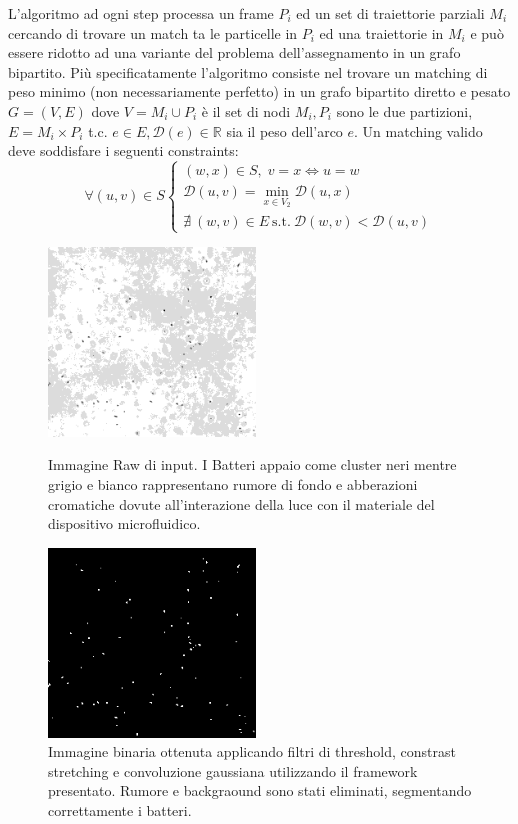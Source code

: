 \documentclass[a4paper,11pt]{paper}
\begin{document}
L'algoritmo ad ogni step processa un frame $P_i$ ed un set di traiettorie parziali $M_i$ cercando di trovare un match ta le particelle in $P_i$ ed una traiettorie in $M_i$ e può essere ridotto ad una variante del problema dell'assegnamento in un grafo bipartito.
Più specificatamente l'algoritmo consiste nel trovare un matching di peso minimo (non necessariamente perfetto) in un grafo bipartito diretto e pesato $G=(V,E)$ dove $V={M_i} \cup P_i$ è il set di nodi ${M_i}, P_i$ sono le due partizioni, $E = {M_i} \times P_i$ t.c. $e \in E, \mathcal{D}(e) \in \mathbb{R}$ sia il peso dell'arco $e$.
Un matching valido deve soddisfare i seguenti constraints: 
\begin{equation}
\forall (u,v) \in S 
\left\{
  \begin{array}{lr}
   (w,x) \in S,\; v=x\Longleftrightarrow u=w\\
   \mathcal{D}(u,v) = \min_{x \in V_2} \mathcal{D}(u,x)  \\
    \nexists \: (w,v) \in E \: \mbox{s.t.} \: \mathcal{D}(w,v) < \mathcal{D}(u,v)
  \end{array}
\right.
\label{matchConstraints}
\end{equation}
\begin{figure}
    \begin{minipage}[l]{0.5\textwidth}
        \centering
        \includegraphics[width=5.5cm]{bacteriasmall}
       \caption{Immagine Raw di input. I Batteri appaio come cluster neri mentre grigio e bianco rappresentano rumore di fondo e abberazioni cromatiche dovute all'interazione della luce con il materiale del dispositivo microfluidico. } \label{AAA}
    \end{minipage}   
    \hfill{}
    \begin{minipage}[r]{0.5\textwidth}
        \centering
        \includegraphics[width=5.5cm]{bacteriasmall_threshold}
              \caption{Immagine binaria ottenuta applicando filtri di threshold, constrast stretching e convoluzione gaussiana utilizzando il framework presentato. Rumore e backgraound sono stati eliminati, segmentando correttamente i batteri.} \label{BBB}
    \end{minipage}
\end{figure}
\end{document}
